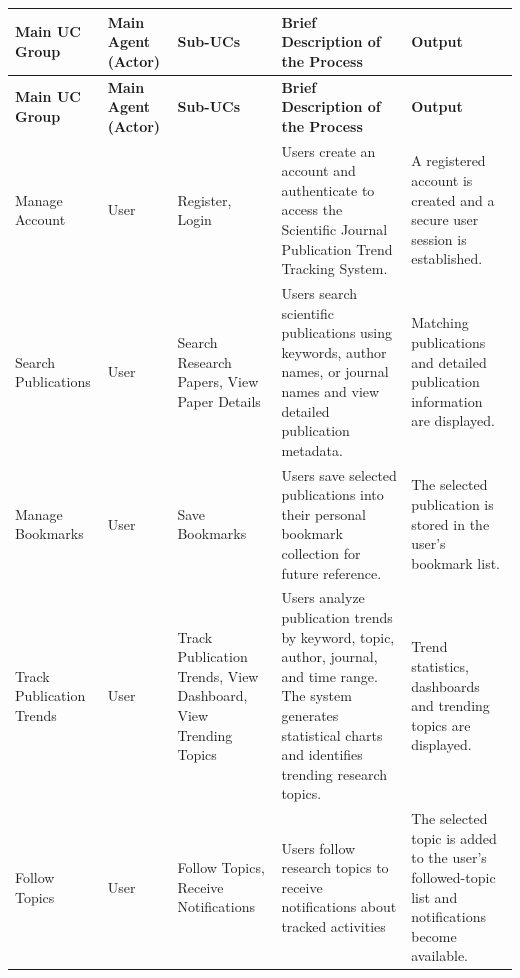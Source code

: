 \documentclass[12pt,a4paper]{article}
\begin{document}
{\begin{longtable}{|>{\raggedright\arraybackslash}p{2cm}|>{\raggedright\arraybackslash}p{1.8cm}|>{\raggedright\arraybackslash}p{2.7cm}|>{\raggedright\arraybackslash}p{4.7cm}|>{\raggedright\arraybackslash}p{2.8cm}|}
	\hline
	\rowcolor{mintheader}
	\textbf{Main UC Group} &
	\textbf{Main Agent (Actor)} &
	\textbf{Sub-UCs} &
	\textbf{Brief Description of the Process} &
	\textbf{Output} \\
	\hline
	\endfirsthead
	
	\hline
	\rowcolor{mintheader}
	\textbf{Main UC Group} &
	\textbf{Main Agent (Actor)} &
	\textbf{Sub-UCs} &
	\textbf{Brief Description of the Process} &
	\textbf{Output} \\
	\hline
	\endhead
	
	\rowcolor{mintrow}
	Manage Account &
	User &
	Register, Login &
	Users create an account and authenticate to access the Scientific Journal Publication Trend Tracking System. &
	A registered account is created and a secure user session is established. \\
	\hline
	
	\rowcolor{mintrow}
	Search Publications &
	User &
	Search Research Papers, View Paper Details &
	Users search scientific publications using keywords, author names, or journal names and view detailed publication metadata. &
	Matching publications and detailed publication information are displayed. \\
	\hline
	
	\rowcolor{mintrow}
	Manage Bookmarks &
	User &
	Save Bookmarks &
	Users save selected publications into their personal bookmark collection for future reference. &
	The selected publication is stored in the user's bookmark list. \\
	\hline
	
	\rowcolor{mintrow}
	Track Publication Trends &
	User &
	Track Publication Trends, View Dashboard, View Trending Topics &
	Users analyze publication trends by keyword, topic, author, journal, and time range. The system generates statistical charts and identifies trending research topics. &
	Trend statistics, dashboards and trending topics are displayed. \\
	\hline
	
	\rowcolor{mintrow}
	Follow Topics &
	User &
	Follow Topics, Receive Notifications &
	Users follow research topics to receive notifications about tracked activities &
	The selected topic is added to the user's followed-topic list and notifications become available. \\
	\hline
	

\end{longtable}}
\end{document}

